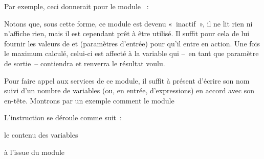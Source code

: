 	Par exemple, ceci donnerait pour le module ~:


	Notons que, sous cette forme, ce module est devenu «~inactif~», il ne
	lit rien ni n’affiche rien, mais il est cependant prêt à être utilisé. Il
	suffit pour cela de lui fournir les valeurs de  et
	 (paramètres d’entrée) pour qu’il entre en action.
	Une fois le maximum calculé, celui-ci est affecté à la variable
	 qui –~en tant que paramètre de sortie~–
	contiendra et renverra le résultat voulu.

	{Pour faire appel aux services de ce module, il
	suffit à présent d’écrire son nom suivi d’un nombre de variables (ou,
	en entrée, d’expressions) en accord avec son en-tête. Montrons par
	un exemple comment le module
	}


	{L’instruction
	 se déroule comme suit~:}
	
	\begin{liste}
	\item {
	{le contenu des variables
	}}
	\item {
	{à l’issue du module
	}}
	\end{liste}

